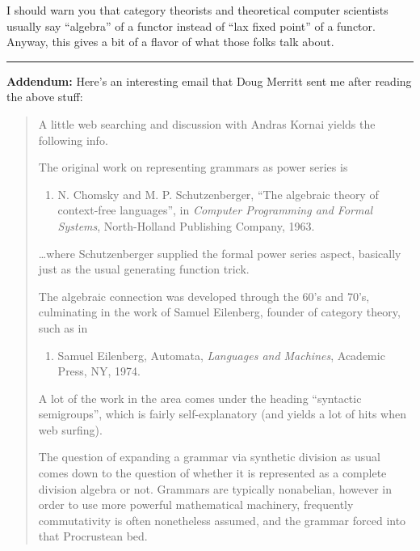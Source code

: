 \documentclass{article}
\def\tightlist{}
\begin{document}
I should warn you that category theorists and theoretical computer
scientists usually say ``algebra'' of a functor instead of ``lax fixed
point'' of a functor. Anyway, this gives a bit of a flavor of what those
folks talk about.

\begin{center}\rule{0.5\linewidth}{0.5pt}\end{center}

\textbf{Addendum:} Here's an interesting email that Doug Merritt sent me
after reading the above stuff:

\begin{quote}
A little web searching and discussion with Andras Kornai yields the
following info.

The original work on representing grammars as power series is

\begin{enumerate}
\def\labelenumi{\arabic{enumi})}
\setcounter{enumi}{3}
\tightlist
\item
  N. Chomsky and M. P. Schutzenberger, ``The algebraic theory of
  context-free languages'', in \emph{Computer Programming and Formal
  Systems}, North-Holland Publishing Company, 1963.
\end{enumerate}

\ldots where Schutzenberger supplied the formal power series aspect,
basically just as the usual generating function trick.

The algebraic connection was developed through the 60's and 70's,
culminating in the work of Samuel Eilenberg, founder of category theory,
such as in

\begin{enumerate}
\def\labelenumi{\arabic{enumi})}
\setcounter{enumi}{4}
\tightlist
\item
  Samuel Eilenberg, Automata, \emph{Languages and Machines}, Academic
  Press, NY, 1974.
\end{enumerate}

A lot of the work in the area comes under the heading ``syntactic
semigroups'', which is fairly self-explanatory (and yields a lot of hits
when web surfing).

The question of expanding a grammar via synthetic division as usual
comes down to the question of whether it is represented as a complete
division algebra or not. Grammars are typically nonabelian, however in
order to use more powerful mathematical machinery, frequently
commutativity is often nonetheless assumed, and the grammar forced into
that Procrustean bed.


\end{quote}
\end{document}
